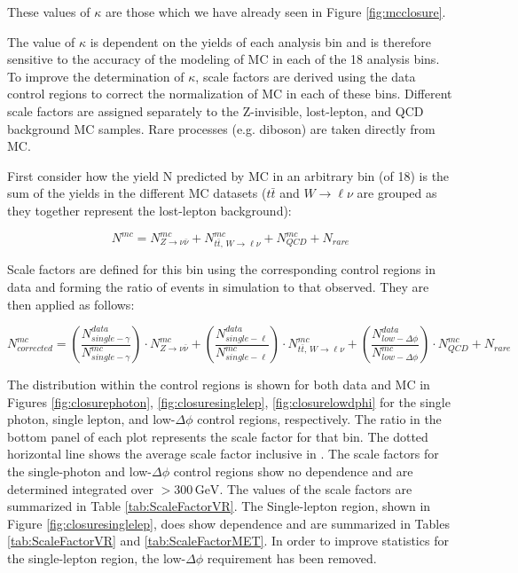 These values of $\kappa$ are those which we have already seen in Figure \ref{fig:mcclosure}.

The value of $\kappa$ is dependent on the yields of each analysis bin and is therefore sensitive to the accuracy of the modeling of MC in each of the 18 analysis bins. To improve the determination of $\kappa$, scale factors are derived using the data control regions to correct the normalization of MC in each of these bins. Different scale factors are assigned separately to the Z-invisible, lost-lepton, and QCD background MC samples. Rare processes (e.g. diboson) are taken directly from MC.

First consider how the yield N predicted by MC in an arbitrary bin (of 18) is the sum of the yields in the different MC datasets ($t\bar{t}$ and $W\rightarrow\ell\nu$ are grouped as they together represent the lost-lepton background):

\begin{equation}
N^{mc} = N_{Z\rightarrow\nu\bar{\nu}}^{mc} + N_{t\bar{t},\,W\rightarrow\ell\nu}^{mc} + N_{QCD}^{mc} + N_{rare}
\end{equation}

Scale factors are defined for this bin using the corresponding control regions in data and forming the ratio of events in simulation to that observed. They are then applied as follows:

\begin{equation}
N_{corrected}^{mc} = \left(\frac{N_{single-\gamma}^{data}}{N_{single-\gamma}^{mc}}\right) \cdot N_{Z\rightarrow\nu\bar{\nu}}^{mc} + \left(\frac{N^{data}_{single-\ell}}{N^{mc}_{single-\ell}}\right) \cdot N^{mc}_{t\bar{t},\,W\rightarrow\ell\nu} + \left(\frac{N^{data}_{low-\Delta\phi}}{N^{mc}_{low-\Delta\phi}}\right) \cdot N_{QCD}^{mc} + N_{rare}
\end{equation}

The \ptmiss distribution within the control regions is shown for both data and MC in Figures \ref{fig:closurephoton}, \ref{fig:closuresinglelep}, \ref{fig:closurelowdphi} for the single photon, single lepton, and low-$\Delta\phi$ control regions, respectively. The ratio in the bottom panel of each plot represents the scale factor for that \ptmiss bin. The dotted horizontal line shows the average scale factor inclusive in \ptmiss. The scale factors for the single-photon and low-$\Delta\phi$ control regions show no \ptmiss dependence and are determined integrated over \ptmiss$>300\,\textrm{GeV}$. The values of the scale factors are summarized in Table \ref{tab:ScaleFactorVR}. The Single-lepton region, shown in Figure \ref{fig:closuresinglelep}, does show \ptmiss dependence and are summarized in Tables \ref{tab:ScaleFactorVR} and \ref{tab:ScaleFactorMET}.  In order to improve statistics for the single-lepton region, the low-$\Delta\phi$ requirement has been removed.

